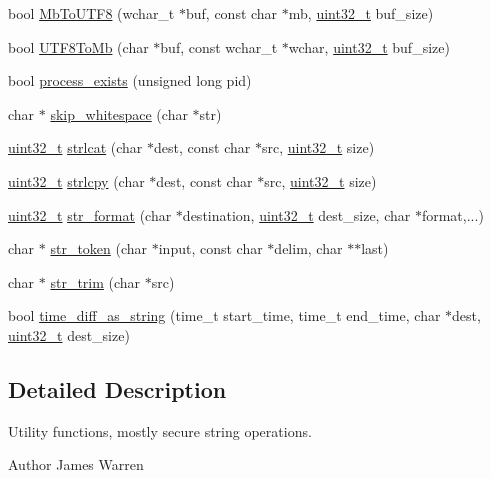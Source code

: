 \begin{DoxyCompactItemize}
\item 
bool \hyperlink{utils_8h_a5cdc599d3bbb0d0cbd517c7747a69ab7}{Mb\-To\-U\-T\-F8} (wchar\-\_\-t $\ast$buf, const char $\ast$mb, \hyperlink{stdint_8h_a435d1572bf3f880d55459d9805097f62}{uint32\-\_\-t} buf\-\_\-size)
\item 
bool \hyperlink{utils_8h_a73d99db62cbee3295fa98c3489ac9471}{U\-T\-F8\-To\-Mb} (char $\ast$buf, const wchar\-\_\-t $\ast$wchar, \hyperlink{stdint_8h_a435d1572bf3f880d55459d9805097f62}{uint32\-\_\-t} buf\-\_\-size)
\item 
bool \hyperlink{utils_8h_af1f4e916381d9c267c7c8d8997ed48dd}{process\-\_\-exists} (unsigned long pid)
\item 
char $\ast$ \hyperlink{utils_8h_afca003914e08d83abdda7e88d58e50fe}{skip\-\_\-whitespace} (char $\ast$str)
\item 
\hyperlink{stdint_8h_a435d1572bf3f880d55459d9805097f62}{uint32\-\_\-t} \hyperlink{utils_8h_a2ff8cc269a34ae7e565ed7663dc2eb3a}{strlcat} (char $\ast$dest, const char $\ast$src, \hyperlink{stdint_8h_a435d1572bf3f880d55459d9805097f62}{uint32\-\_\-t} size)
\item 
\hyperlink{stdint_8h_a435d1572bf3f880d55459d9805097f62}{uint32\-\_\-t} \hyperlink{utils_8h_a63a72ee56ddf07d1f097f4425c1cb38b}{strlcpy} (char $\ast$dest, const char $\ast$src, \hyperlink{stdint_8h_a435d1572bf3f880d55459d9805097f62}{uint32\-\_\-t} size)
\item 
\hyperlink{stdint_8h_a435d1572bf3f880d55459d9805097f62}{uint32\-\_\-t} \hyperlink{utils_8h_a3028decc6adec38215582336b1584387}{str\-\_\-format} (char $\ast$destination, \hyperlink{stdint_8h_a435d1572bf3f880d55459d9805097f62}{uint32\-\_\-t} dest\-\_\-size, char $\ast$format,...)
\item 
char $\ast$ \hyperlink{utils_8h_a406ceeee42dbf78d120302a88ef8e851}{str\-\_\-token} (char $\ast$input, const char $\ast$delim, char $\ast$$\ast$last)
\item 
char $\ast$ \hyperlink{utils_8h_ae449a29602e667a885747f7f1f06c8dd}{str\-\_\-trim} (char $\ast$src)
\item 
bool \hyperlink{utils_8h_adb56a00005481d819a7e43b724b1d748}{time\-\_\-diff\-\_\-as\-\_\-string} (time\-\_\-t start\-\_\-time, time\-\_\-t end\-\_\-time, char $\ast$dest, \hyperlink{stdint_8h_a435d1572bf3f880d55459d9805097f62}{uint32\-\_\-t} dest\-\_\-size)
\end{DoxyCompactItemize}


\subsection{Detailed Description}
Utility functions, mostly secure string operations. \begin{DoxyAuthor}{Author}
James Warren 
\end{DoxyAuthor}


